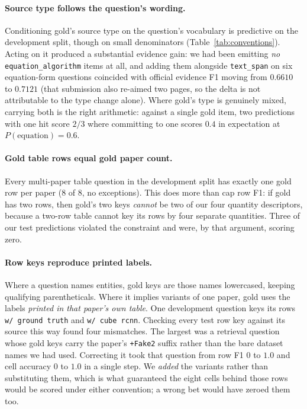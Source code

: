 \documentclass[11pt]{article}
\newcommand{\bk}{\allowbreak}
\begin{document}
\paragraph{Source type follows the question's wording.}
Conditioning gold's source type on the question's vocabulary is predictive on
the development split, though on small denominators
(Table~\ref{tab:conventions}). Acting on it produced a substantial evidence gain:
we had been emitting \emph{no} \texttt{equation\_\bk{}algorithm} items at all, and
adding them alongside \texttt{text\_span} on six equation-form questions
coincided with official evidence F1 moving from $0.6610$ to $0.7121$ (that
submission also re-aimed two pages, so the delta is not attributable to the type
change alone). Where gold's type is genuinely mixed, carrying both is the right
arithmetic: against a single gold item, two predictions with one hit score $2/3$
where committing to one scores $0.4$ in expectation at $P(\text{equation})=0.6$.

\paragraph{Gold table rows equal gold paper count.}
Every multi-paper table question in the development split has exactly one gold
row per paper (8 of 8, no exceptions). This does more than cap row F1: if gold
has two rows, then gold's two keys \emph{cannot} be two of our four quantity
descriptors, because a two-row table cannot key its rows by four separate
quantities. Three of our test predictions violated the constraint and were, by
that argument, scoring zero.

\paragraph{Row keys reproduce printed labels.}
Where a question names entities, gold keys are those names lowercased, keeping
qualifying parentheticals. Where it implies variants of one paper, gold uses the
labels \emph{printed in that paper's own table}. One development question keys
its rows \texttt{w/ ground truth} and \texttt{w/ cube rcnn}. Checking every test
row key against its source this way found four mismatches. The largest was a
retrieval question whose gold keys carry the paper's \texttt{+Fake2} suffix
rather than the bare dataset names we had used. Correcting it took that question
from row F1 $0$ to $1.0$ and cell accuracy $0$ to $1.0$ in a single step. We
\emph{added} the variants rather than substituting them, which is what guaranteed
the eight cells behind those rows would be scored under either convention; a
wrong bet would have zeroed them too.
\end{document}
